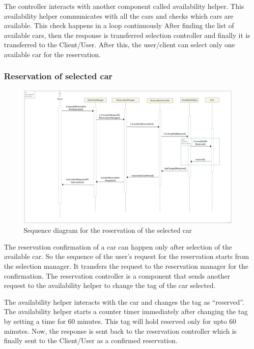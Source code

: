 The controller interacts with another component called availability helper.
This availability helper communicates with all the cars and checks which cars are available. This check happens in a loop continuously After finding the list of available cars, then the response is transferred selection controller and finally it is transferred to the Client/User. After this, the user/client can select only one available car for the reservation.

\subsubsection{Reservation of selected car}
\begin{figure}[t]
	\centering
	\includegraphics[width=\linewidth,keepaspectratio]{figures/reservation_runtime.eps}
	\caption{Sequence diagram for the reservation of the selected car}
	\label{fig:reservation_runtime}
\end{figure}

The reservation confirmation of a car can happen only after selection of the available car. So the sequence of the user's request for the reservation starts from the selection manager. It transfers the request to the reservation manager for the confirmation. The reservation controller is a component that sends another request to the availability helper
to change the tag of the car selected.

The availability helper interacts with the car and changes the tag as ``reserved''. The availability helper starts a counter timer immediately after changing the tag by setting a time for 60 minutes. This tag will hold reserved only for upto 60 minutes. Now, the response is sent back to the reservation controller which is finally sent to the Client/User as a confirmed reservation.

